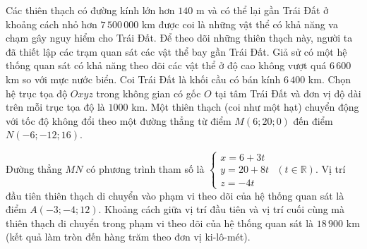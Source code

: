\begin{ex}
Các thiên thạch có đường kính lớn hơn $140$ m và có thể lại gần Trái Đất ở khoảng cách nhỏ hơn $7\,500\,000$ km được coi là những vật thể có khả năng va chạm gây nguy hiểm cho Trái Đất. Để theo dõi những thiên thạch này, người ta đã thiết lập các trạm quan sát các vật thể bay gần Trái Đất. Giả sử có một hệ thống quan sát có khả năng theo dõi các vật thể ở độ cao không vượt quá $6\,600$ km so với mực nước biển. Coi Trái Đất là khối cầu có bán kính $6\,400$ km. Chọn hệ trục tọa độ $Oxyz$ trong không gian có gốc $O$ tại tâm Trái Đất và đơn vị độ dài trên mỗi trục tọa độ là $1000$ km. Một thiên thạch (coi như một hạt) chuyển động với tốc độ không đổi theo một đường thẳng từ điểm $M(6;20;0)$ đến điểm $N(-6;-12;16)$.
\begin{center}
\end{center}
\choiceTF
{\True Đường thẳng $MN$ có phương trình tham số là $\begin{cases}x=6+3t\\ y=20+8t\\ z=-4t\end{cases}$ $(t\in\mathbb R)$.}
{Vị trí đầu tiên thiên thạch di chuyển vào phạm vi theo dõi của hệ thống quan sát là điểm $A(-3;-4;12)$.}
{\True Khoảng cách giữa vị trí đầu tiên và vị trí cuối cùng mà thiên thạch di chuyển trong phạm vi theo dõi của hệ thống quan sát là $18\,900$ km (kết quả làm tròn đến hàng trăm theo đơn vị ki-lô-mét).}

\end{ex}
